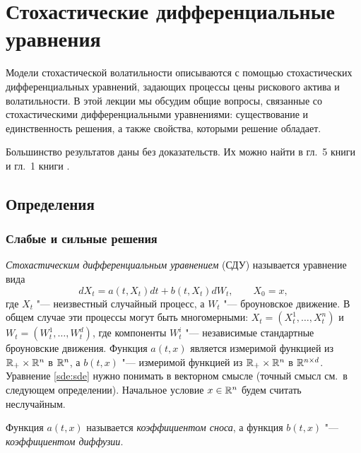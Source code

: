 
\chapter{Стохастические дифференциальные уравнения}
\label{ch:sde}
\chaptertoc

Модели стохастической волатильности описываются с помощью стохастических дифференциальных уравнений, задающих процессы цены рискового актива и волатильности.
В этой лекции мы обсудим общие вопросы, связанные со стохастическими дифференциальными уравнениями: существование и единственность решения, а также свойства, которыми решение обладает.

Большинство результатов даны без доказательств.
Их можно найти в гл.~5 книги \cite{KaratzasShreve91} и гл.~1 книги \cite{ChernyEngelbert}.


\section{Определения}
\subsection{Слабые и сильные решения}

\emph{Стохастическим дифференциальным уравнением} (СДУ) называется уравнение вида
\begin{equation}
\label{sde:sde}
d X_t = a(t,X_t)dt + b(t,X_t)dW_t, \qquad X_0=x,
\end{equation}
где $X_t$ "--- неизвестный случайный процесс, а $W_t$ "--- броуновское движение.
В общем случае эти процессы могут быть многомерными: $X_t = (X_t^1,\dots,X_t^n)$ и $W_t=(W_t^1,\dots,W_t^d)$, где компоненты $W_t^i$ "--- независимые стандартные броуновские движения.
Функция $a(t,x)$ является измеримой функцией из $\mathbb{R}_+\times\mathbb{R}^n$ в $\mathbb{R}^n$, а $b(t,x)$ "--- измеримой функцией из $\mathbb{R}_+\times\mathbb{R}^n$ в $\mathbb{R}^{n\times d}$.
Уравнение \eqref{sde:sde} нужно понимать в векторном смысле (точный смысл см.\ в следующем определении).
Начальное условие $x\in\mathbb{R}^n$ будем считать неслучайным.

Функция $a(t,x)$ называется \emph{коэффициентом сноса}, а функция $b(t,x)$ "--- \emph{коэффициентом диффузии}.

